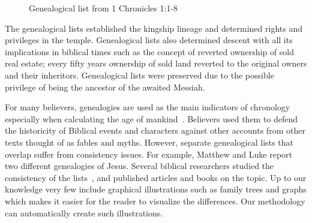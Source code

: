 \documentclass[11pt]{article}
\begin{document}
\begin{figure}\centering
{}
\caption{Genealogical list from 1 Chronicles 1:1-8}
\end{figure}


The genealogical lists established the kingship lineage and determined
rights and privileges in the temple. Genealogical lists also determined descent with all its implications in biblical times
such as the concept of reverted ownership of sold real estate; every fifty years ownership of sold land reverted to the 
original owners and their inheritors. Genealogical lists were preserved due to the possible privilege of being the ancestor of the awaited Messiah.~\cite{catholicEncyclopedia:Online}

For many believers, genealogies are used as the main indicators of chronology especially when calculating the age of mankind~\cite{Thomas:92}.
Believers used them to defend the historicity of Biblical events and characters against other accounts from other 
texts thought of as fables and myths. 
However, separate genealogical lists that overlap suffer from consistency issues. 
For example, Matthew and Luke report two different genealogies of Jesus. 
Several biblical researchers studied the consistency of the lists~\cite{catholicEncyclopedia:Online,Belote:Online,completeBibleGenealogy:Online}, 
and published articles and books on the topic. Up to our knowledge very few include graphical illustrations such as family trees and graphs 
which makes it easier for the reader to visualize the differences. 
Our methodology can automatically create such illustrations.
\end{document}
